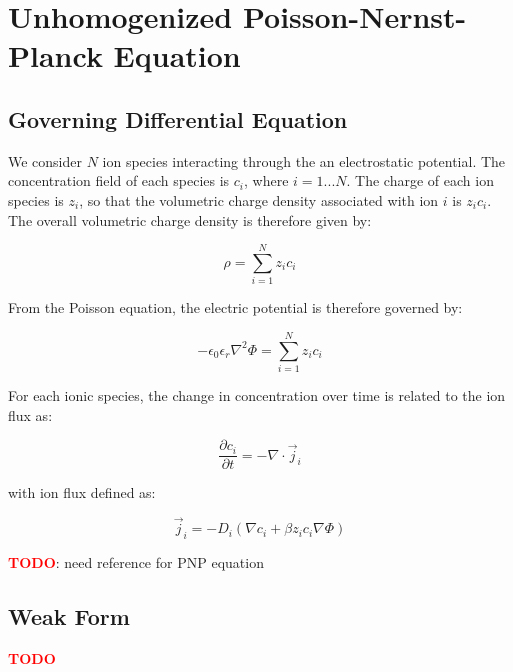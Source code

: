
\section{Unhomogenized Poisson-Nernst-Planck Equation}\label{sec:unhom_pnp}

\subsection{Governing Differential Equation}\label{subsec:unhom_pnp_gov}

We consider $N$ ion species interacting through the an electrostatic potential.
The concentration field of each species is $c_i$, where $i=1 ... N$.
The charge of each ion species is $z_i$, so that the volumetric charge density associated
with ion $i$ is $z_i c_i$.
The overall volumetric charge density is therefore given by:

\begin{equation}
\rho = \sum_{i=1}^{N}z_i c_i
\end{equation}

From the Poisson equation, the electric potential is therefore governed by:

\begin{equation}
-\epsilon_{0}\epsilon_{r} \nabla^2 \Phi = \sum_{i=1}^{N}z_i c_i
\end{equation}

For each ionic species, the change in concentration over time is related to the ion flux as:

\begin{equation} 
\frac{\partial c_i}{\partial t} = - \nabla \cdot \vec{j}_i
\end{equation} 

with ion flux defined as:

\begin{equation}
\vec{j}_i  = -D_i \left( \nabla c_i + \beta z_i c_i \nabla \Phi \right)
\end{equation}

\textcolor{red}{\textbf{TODO}}: need reference for PNP equation

\subsection{Weak Form}\label{subsec:unhom_pnp_weak}

\textcolor{red}{\textbf{TODO}}
